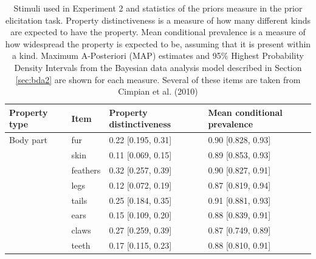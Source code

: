 \documentclass[10pt,letterpaper]{article}
\begin{document}

    
\begin{table}[h]
\centering
\caption{Stimuli used in Experiment 2 and statistics of the priors measure in the prior elicitation task. 
Property distinctiveness is a measure of how many different kinds are expected to have the property. Mean conditional prevalence is a measure of how widespread the property is expected to be, assuming that it is present within a kind.
Maximum A-Posteriori (MAP) estimates and 95\% Highest Probability Density Intervals from the Bayesian data analysis model described in Section \ref{sec:bda2} are shown for each measure.
Several of these items are taken from Cimpian et al. (2010)}
\label{tab:novelGenericsStimuli}
\begin{tabular}{| l || l | l | l |}
\hline
Property type             & Item          & Property distinctiveness               & Mean conditional prevalence                     \\
\hline \hline
Body part              & fur                & 0.22 {[}0.195, 0.31{]} & 0.90 {[}0.828, 0.93{]} \\
                  & skin               & 0.11 {[}0.069, 0.15{]} & 0.89 {[}0.853, 0.93{]} \\
                  & feathers           & 0.32 {[}0.257, 0.39{]} & 0.90 {[}0.827, 0.91{]} \\
                  & legs               & 0.12 {[}0.072, 0.19{]} & 0.87 {[}0.819, 0.94{]} \\
                  & tails              & 0.25 {[}0.184, 0.35{]} & 0.91 {[}0.881, 0.93{]} \\
                  & ears               & 0.15 {[}0.109, 0.20{]} & 0.88 {[}0.839, 0.91{]} \\
                  & claws              & 0.27 {[}0.259, 0.39{]} & 0.87 {[}0.749, 0.89{]} \\
                  & teeth              & 0.17 {[}0.115, 0.23{]} & 0.88 {[}0.810, 0.91{]} \\

\end{tabular}
\end{table}
\end{document}
